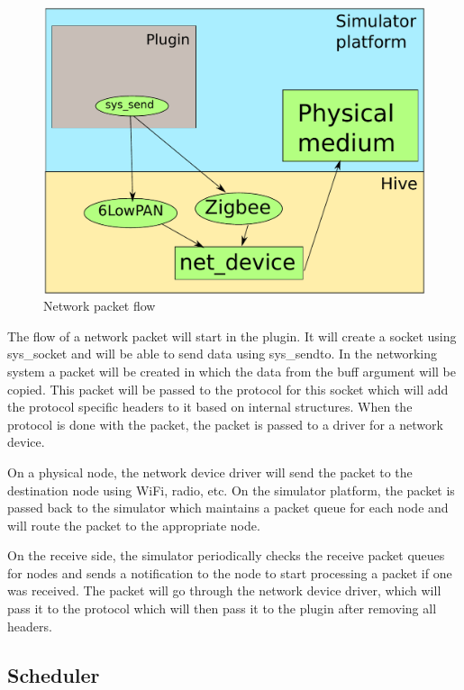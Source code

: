 \begin{figure}[htb]
  \begin{center}
    \includegraphics[scale=0.75]{img/networking.pdf}
    \caption{Network packet flow}
  \end{center}
\end{figure}

The flow of a network packet will start in the plugin. It will create a socket
using sys\_socket and will be able to send data using sys\_sendto. In the
networking system a packet will be created in which the data from the buff
argument will be copied. This packet will be passed to the protocol for this
socket which will add the protocol specific headers to it based on internal
structures. When the protocol is done with the packet, the packet is passed to a
driver for a network device.

On a physical node, the network device driver will send the packet to the
destination node using WiFi, radio, etc. On the simulator platform, the
packet is passed back to the simulator which maintains a packet queue for each
node and will route the packet to the appropriate node.

On the receive side, the simulator periodically checks the receive packet
queues for nodes and sends a notification to the node to start processing a
packet if one was received.
The packet will go through the network device driver, which will pass it to
the protocol which will then pass it to the plugin after removing all headers.

\subsection{Scheduler}

